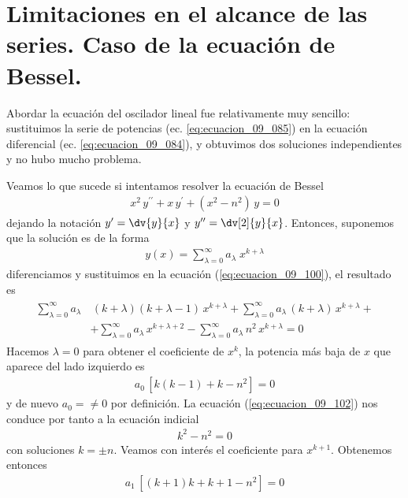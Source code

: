 \section*{Limitaciones en el alcance de las series. Caso de la ecuación de Bessel.}
Abordar la ecuación del oscilador lineal fue relativamente muy sencillo: sustituimos la serie de potencias (ec. \ref{eq:ecuacion_09_085}) en la ecuación diferencial (ec. \ref{eq:ecuacion_09_084}), y obtuvimos dos soluciones independientes y no hubo mucho problema.
\par
Veamos lo que sucede si intentamos resolver la ecuación de Bessel
\begin{align}
x^{2} \, y^{\prime \prime} + x \, y^{\prime} + (x^{2} - n^{2}) \, y = 0
\label{eq:ecuacion_09_100}
\end{align}
dejando la notación $y^{\prime} = \dv{y}{x}$ y $y^{\prime \prime} = \dv[2]{y}{x}$. Entonces, suponemos que la solución es de la forma
\begin{align*}
y(x) = \sum_{\lambda=0}^{\infty} a_{\lambda} \; x^{k + \lambda}
\end{align*}
diferenciamos y sustituimos en la ecuación (\ref{eq:ecuacion_09_100}), el resultado es
\begin{align}
\begin{aligned}
\sum_{\lambda=0}^{\infty} a_{\lambda} & \, (k + \lambda)(k + \lambda - 1) \, x^{k + \lambda} + \sum_{\lambda=0}^{\infty} a_{\lambda} \, (k + \lambda) \, x^{k + \lambda} + \\[0.5em]
& + \sum_{\lambda=0}^{\infty} a_{\lambda} \, x^{k + \lambda + 2} - \sum_{\lambda=0}^{\infty} a_{\lambda} \, n^{2} \, x^{k + \lambda}  = 0
\end{aligned}
\label{eq:ecuacion_09_101}
\end{align}
Hacemos $\lambda = 0$ para obtener el coeficiente de $x^{k}$, la potencia más baja de $x$ que aparece del lado izquierdo es
\begin{align}
a_{0} \, [ k (k - 1) + k - n^{2} ] = 0
\label{eq:ecuacion_09_102}
\end{align}
y de nuevo $a_{0} = \neq 0$ por definición. La ecuación (\ref{eq:ecuacion_09_102}) nos conduce por tanto a la ecuación indicial
\begin{align}
k^{2} - n^{2} = 0
\label{eq:ecuacion_09_103}
\end{align}
con soluciones $k = \pm n$.
Veamos con interés el coeficiente para $x^{k+1}$. Obtenemos entonces
\begin{align*}
a_{1} \, [(k + 1) k + k + 1 - n^{2} ] = 0
\end{align*}
